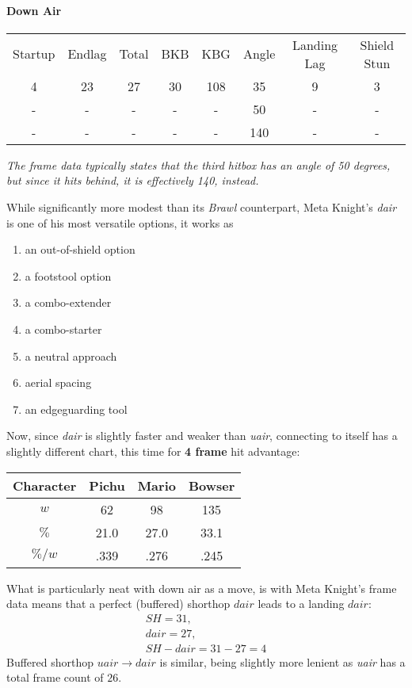 \paragraph{Down Air}
\begin{center}
	\begin{tabular}{| c  c  c | c  c  c | c  c |}
		\hline
		Startup	& Endlag & Total & BKB & KBG & Angle &	Landing Lag	&	Shield Stun	\\
		4	&	23	&	27	&	30	&	108 & 	35\deg	&	9 	&	3	\\
		-	&	-	&	-	&	- 	& 	- 	&	50\deg	&	-	&	-	\\
		-	&	-	&	-	&	-	&	-	&	140\deg &	-	&	-	\\
		\hline
	\end{tabular}
	
	\emph{The frame data typically states that the third hitbox has an angle of 50 degrees, but since it hits behind, it is effectively 140\deg, instead.}
\end{center}
While significantly more modest than its \textit{Brawl} counterpart, Meta Knight's \textit{dair} is one of his most versatile options, it works as
	\begin{enumerate}[label = \roman*.]
		\item an out-of-shield option
		\item a footstool option
		\item a combo-extender
		\item a combo-starter
		\item a neutral approach
		\item aerial spacing
		\item an edgeguarding tool
	\end{enumerate}
	Now, since \textit{dair} is slightly faster and weaker than \textit{uair}, connecting to itself has a slightly different chart, this time for \textbf{4 frame} hit advantage:
	\begin{center}
		\begin{tabular}{| c c c c |}
			\hline
			\textbf{Character} & Pichu & Mario & Bowser	\\
			\hline
			$w$		&	62		&	98		&	135		\\
			$\%$	&	21.0	&	27.0	&	33.1	\\
			$\%/w$	&	.339	&	.276	&	.245	\\
			\hline
		\end{tabular}
	\end{center}
	What is particularly neat with down air as a move, is with Meta Knight's frame data means that a perfect (buffered) shorthop $dair$ leads to a landing $dair$:
	\begin{gather*}
		SH = 31,\\ dair = 27,\\ SH - dair = 31 - 27 = 4
	\end{gather*}
	Buffered shorthop $uair \to dair$ is similar, being slightly more lenient as \textit{uair} has a total frame count of $26$.
